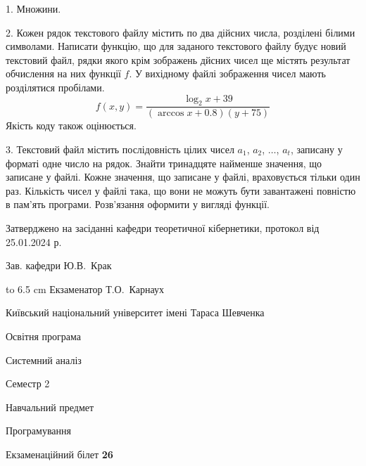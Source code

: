 \documentclass[12pt, ukrainian]{article}
\begin{document}
{%
1. Множини.%
\par
\vspace{2mm}

2. Кожен рядок текстового файлу містить по два дійсних числа, розділені білими символами.
Написати функцію, що для заданого текстового файлу будує новий текстовий файл, рядки якого крім зображень дйсних чисел ще містять результат обчислення на них функції $f$. У вихідному файлі зображення чисел мають розділятися пробілами. 
$$f(x, y) =\frac{\log_{2} x + 39}{(\arccos x + 0.8) (y + 75)}$$ 
Якість коду також оцінюється.

\par
\vspace{2mm}

3. Текстовий файл містить послідовність цілих чисел $a_1$, $a_2$, $\ldots$, $a_t$, записану у форматі одне число на рядок. Знайти тринадцяте найменше значення, що записане у файлі. Кожне значення, що записане у файлі, враховується тільки один раз. Кількість чисел у файлі така, що вони не можуть бути завантажені повністю в пам'ять програми. Розв'язання оформити у вигляді функції.

}
{\smallskip\smallskip \begin {scriptsize} Затверджено на засіданні кафедри теоретичної кібернетики, протокол   від   25.01.2024 р.\par\smallskip\smallskip\smallskip\smallskip
{\parbox {6.5 cm} {Зав. кафедри \dotfill Ю.В.~Крак}}\hspace {0.7cm} {\hbox to 6.5 cm { Екзаменатор \dotfill Т.О.~Карнаух}} \end{scriptsize}}
\vspace{0.9cm}
{{\begin {scriptsize}\par
{ \center  Київський національний університет імені Тараса Шевченка \par}
{\parbox {5 cm}{Освітня програма \hfill}{\parbox {7 cm}{Системний аналіз\hfill}}\parbox {6 cm}{\hfill Семестр 2}}\par
{\parbox {5 cm} {Навчальний предмет \hfill}\parbox {7 cm}{Програмування \hfill}\parbox {6cm}{\hfill}\par}\vspace{-15pt} \end{scriptsize}}{\center Екзаменаційний білет \No \textbf { 26 }\par}}
\end{document}
